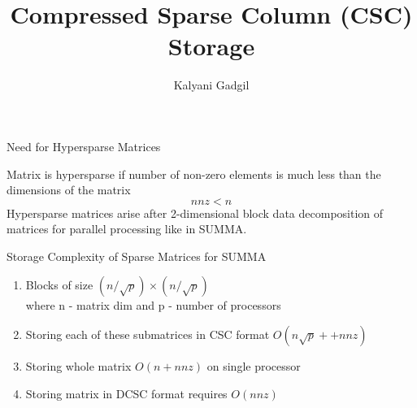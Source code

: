 \documentclass[12pt]{beamer}
\author{Kalyani Gadgil}
\title{Compressed Sparse Column (CSC) Storage }
\begin{document}
\newcommand\hl[1]{\tikz[overlay, remember picture,baseline=-\the\dimexpr\fontdimen22\textfont2\relax]\node[rectangle,fill=green!60,rounded corners,fill opacity = 0.2,draw,thick,text opacity =1] {$#1$};} 

\newcommand{\tikzmark}[2]{\tikz[overlay, remember picture] \node[inner sep=0pt, outer sep=0pt, anchor=base] (#1) {#2};}

 
\begin{frame}
\titlepage
\end{frame}

\begin{frame}{Need for Hypersparse Matrices}
	\begin{center}
		Matrix is hypersparse if number of non-zero elements is much less than the dimensions of the matrix $$ nnz < n $$
		Hypersparse matrices arise after 2-dimensional block data decomposition of matrices for parallel processing like in SUMMA. \\
	\end{center}
\end{frame}

\begin{frame}{Storage Complexity of Sparse Matrices for SUMMA}
	\begin{enumerate}
	\item Blocks of size $(n/\sqrt{p})\times (n/\sqrt{p})$ \\ where n - matrix dim and p - number of processors
	\item Storing each of these submatrices in CSC format $O(n\sqrt{p} ++ nnz)$
	\item Storing whole matrix $O(n + nnz)$ on single processor
	\item Storing matrix in DCSC format requires $O(nnz)$
\end{enumerate}		

\end{frame}
\end{document}
